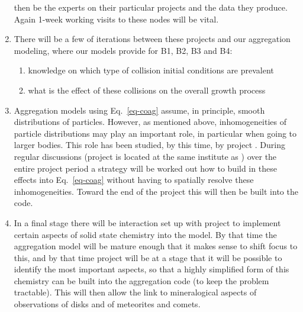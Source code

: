 \begin{enumerate}
then be the experts on their particular projects and the data they produce.
Again 1-week working visits to these nodes will be vital.
\item There will be a few of iterations between these
projects and our aggregation modeling, where our models provide for B1,
B2, B3 and B4:
\begin{enumerate}
\item knowledge on which type of collision initial conditions are prevalent
\item what is the effect of these collisions on the overall growth process
\end{enumerate}
\item Aggregation models using Eq.~\ref{eq-coag} assume, in principle,
smooth distributions of particles. However, as mentioned above,
inhomogeneities of particle distributions may play an important role, in
particular when going to larger bodies. This role has been studied, by this
time, by project \projklahr{}. During regular discussions (project
\projklahr{} is located at the same institute as \projdul{}) over the
entire project period a strategy will be worked out how to build in these
effects into Eq.~\ref{eq-coag} without having to spatially resolve these
inhomogeneities. Toward the end of the project this will then be built
into the code.
\item In a final stage there will be interaction set up with project
\projtscharn{} to implement certain aspects of solid state chemistry into
the model. By that time the aggregation model will be mature enough that it
makes sense to shift focus to this, and by that time project \projtscharn{}
will be at a stage that it will be possible to identify the most important
aspects, so that a highly simplified form of this chemistry can be built 
into the aggregation code (to keep the problem tractable). This will then
allow the link to mineralogical aspects of observations of disks and of
meteorites and comets.
\end{enumerate}

